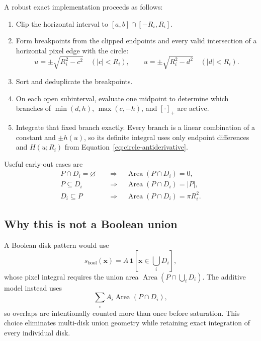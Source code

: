 \documentclass[11pt,a4paper]{article}
\newcommand{\ind}{\mathbf{1}}
\newcommand{\Area}{\operatorname{Area}}
\begin{document}
A robust exact implementation proceeds as follows:
\begin{enumerate}[leftmargin=*,itemsep=2pt]
\item Clip the horizontal interval to $[a,b]\cap[-R_i,R_i]$.
\item Form breakpoints from the clipped endpoints and every valid intersection
      of a horizontal pixel edge with the circle:
      \begin{equation}
      u=\pm\sqrt{R_i^2-c^2}\quad (|c|<R_i),
      \qquad
      u=\pm\sqrt{R_i^2-d^2}\quad (|d|<R_i).
      \end{equation}
\item Sort and deduplicate the breakpoints.
\item On each open subinterval, evaluate one midpoint to determine which branches
      of $\min(d,h)$, $\max(c,-h)$, and $[\cdot]_+$ are active.
\item Integrate that fixed branch exactly. Every branch is a linear combination
      of a constant and $\pm h(u)$, so its definite integral uses only endpoint
      differences and $H(u;R_i)$ from Equation~\eqref{eq:circle-antiderivative}.
\end{enumerate}

Useful early-out cases are
\begin{align}
P\cap D_i=\varnothing
&\quad\Rightarrow\quad \Area(P\cap D_i)=0,\\
P\subseteq D_i
&\quad\Rightarrow\quad \Area(P\cap D_i)=|P|,\\
D_i\subseteq P
&\quad\Rightarrow\quad \Area(P\cap D_i)=\pi R_i^2.
\end{align}

\subsection{Why this is not a Boolean union}

A Boolean disk pattern would use
\begin{equation}
s_{\mathrm{bool}}(\bm{x})
=
A\,\ind\!\left[\bm{x}\in\bigcup_iD_i\right],
\end{equation}
whose pixel integral requires the union area
$\Area(P\cap\bigcup_iD_i)$. The additive model instead uses
\begin{equation}
\sum_i A_i\Area(P\cap D_i),
\end{equation}
so overlaps are intentionally counted more than once before saturation. This
choice eliminates multi-disk union geometry while retaining exact integration of
every individual disk.
\end{document}

